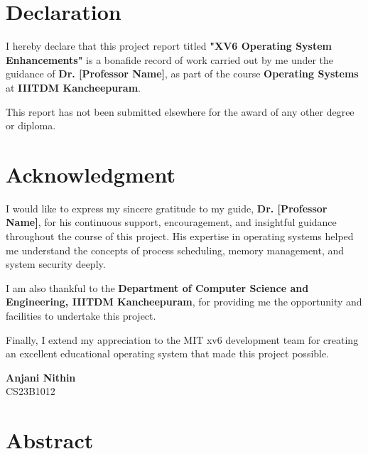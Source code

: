 \documentclass[a4paper,12pt]{report}
\begin{document}
\chapter*{Declaration}
\thispagestyle{contentpages}

I hereby declare that this project report titled \textbf{"XV6 Operating System Enhancements"} is a bonafide record of work carried out by me under the guidance of \textbf{Dr. [Professor Name]}, as part of the course \textbf{Operating Systems} at \textbf{IIITDM Kancheepuram}.

This report has not been submitted elsewhere for the award of any other degree or diploma.

\vspace{2cm}

\begingroup
\let\clearpage\relax

\chapter*{Acknowledgment}
\thispagestyle{contentpages}

I would like to express my sincere gratitude to my guide, \textbf{Dr. [Professor Name]}, for his continuous support, encouragement, and insightful guidance throughout the course of this project. His expertise in operating systems helped me understand the concepts of process scheduling, memory management, and system security deeply.

I am also thankful to the \textbf{Department of Computer Science and Engineering, IIITDM Kancheepuram}, for providing me the opportunity and facilities to undertake this project.

Finally, I extend my appreciation to the MIT xv6 development team for creating an excellent educational operating system that made this project possible.

\vspace{1cm}

\begin{flushright}
\textbf{Anjani Nithin}\\
CS23B1012
\end{flushright}

\newpage

\chapter*{Abstract}
\thispagestyle{contentpages}
\justifying
\noindent
\end{document}
